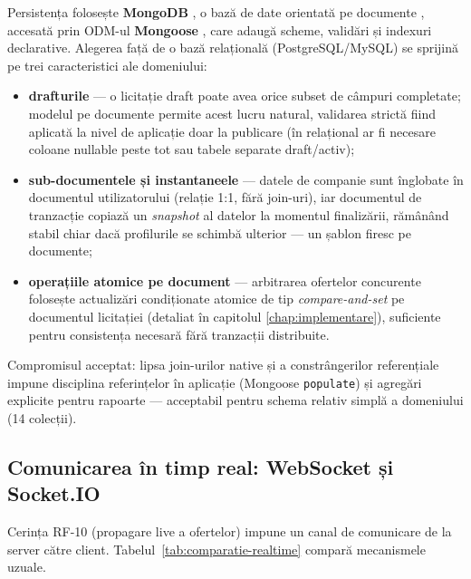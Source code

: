 Persistența folosește \textbf{MongoDB} \cite{mongodocs}, o bază de date orientată pe documente \cite{chodorow2013}, accesată prin ODM-ul \textbf{Mongoose} \cite{mongoosedocs}, care adaugă scheme, validări și indexuri declarative. Alegerea față de o bază relațională (PostgreSQL/MySQL) se sprijină pe trei caracteristici ale domeniului:

\begin{itemize}
    \item \textbf{drafturile} --- o licitație draft poate avea orice subset de câmpuri completate; modelul pe documente permite acest lucru natural, validarea strictă fiind aplicată la nivel de aplicație doar la publicare (în relațional ar fi necesare coloane nullable peste tot sau tabele separate draft/activ);
    \item \textbf{sub-documentele și instantaneele} --- datele de companie sunt înglobate în documentul utilizatorului (relație 1:1, fără join-uri), iar documentul de tranzacție copiază un \textit{snapshot} al datelor la momentul finalizării, rămânând stabil chiar dacă profilurile se schimbă ulterior --- un șablon firesc pe documente;
    \item \textbf{operațiile atomice pe document} --- arbitrarea ofertelor concurente folosește actualizări condiționate atomice de tip \textit{compare-and-set} pe documentul licitației (detaliat în capitolul \ref{chap:implementare}), suficiente pentru consistența necesară fără tranzacții distribuite.
\end{itemize}

Compromisul acceptat: lipsa join-urilor native și a constrângerilor referențiale impune disciplina referințelor în aplicație (Mongoose \texttt{populate}) și agregări explicite pentru rapoarte --- acceptabil pentru schema relativ simplă a domeniului (14 colecții).

\subsection{Comunicarea în timp real: WebSocket și Socket.IO}

Cerința RF-10 (propagare live a ofertelor) impune un canal de comunicare de la server către client. Tabelul~\ref{tab:comparatie-realtime} compară mecanismele uzuale.

